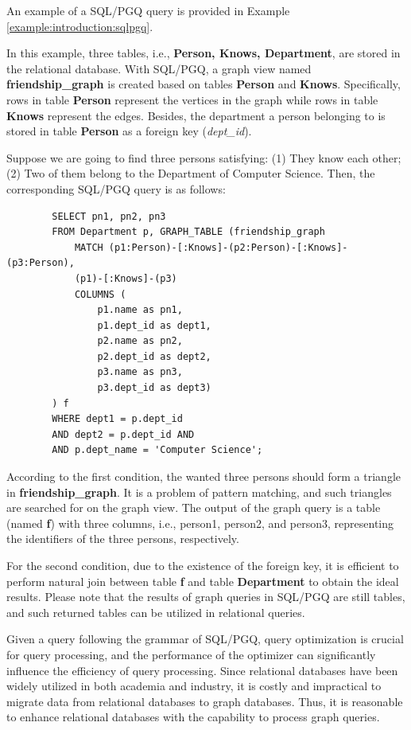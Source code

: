 An example of a SQL/PGQ query is provided in Example \ref{example:introduction:sqlpgq}.

\begin{example}
    \label{example:introduction:sqlpgq}
    In this example, three tables, i.e., \textbf{Person, Knows, Department}, are stored in the relational database.
    With SQL/PGQ, a graph view named \textbf{friendship\_graph} is created based on tables \textbf{Person} and \textbf{Knows}.
    Specifically, rows in table \textbf{Person} represent the vertices in the graph while rows in table \textbf{Knows} represent the edges.
    Besides, the department a person belonging to is stored in table \textbf{Person} as a foreign key (\textit{dept\_id}).

    Suppose we are going to find three persons satisfying: (1) They know each other; (2) Two of them belong to the Department of Computer Science.
    Then, the corresponding SQL/PGQ query is as follows:
    \begin{lstlisting}
        SELECT pn1, pn2, pn3
        FROM Department p, GRAPH_TABLE (friendship_graph
            MATCH (p1:Person)-[:Knows]-(p2:Person)-[:Knows]-(p3:Person),
            (p1)-[:Knows]-(p3)
            COLUMNS (
                p1.name as pn1,
                p1.dept_id as dept1,
                p2.name as pn2,
                p2.dept_id as dept2,
                p3.name as pn3,
                p3.dept_id as dept3)
        ) f
        WHERE dept1 = p.dept_id
        AND dept2 = p.dept_id AND
        AND p.dept_name = 'Computer Science';
    \end{lstlisting}
    According to the first condition, the wanted three persons should form a triangle in \textbf{friendship\_graph}.
    It is a problem of pattern matching, and such triangles are searched for on the graph view.
    The output of the graph query is a table (named \textbf{f}) with three columns, i.e., person1, person2, and person3, representing the identifiers of the three persons, respectively.

    For the second condition, due to the existence of the foreign key, it is efficient to perform natural join between table \textbf{f} and table \textbf{Department} to obtain the ideal results.
    Please note that the results of graph queries in SQL/PGQ are still tables, and such returned tables can be utilized in relational queries.
\end{example}

Given a query following the grammar of SQL/PGQ, query optimization is crucial for query processing, and the performance of the optimizer can significantly influence the efficiency of query processing.
Since relational databases have been widely utilized in both academia and industry, it is costly and impractical to migrate data from relational databases to graph databases.
Thus, it is reasonable to enhance relational databases with the capability to process graph queries.

